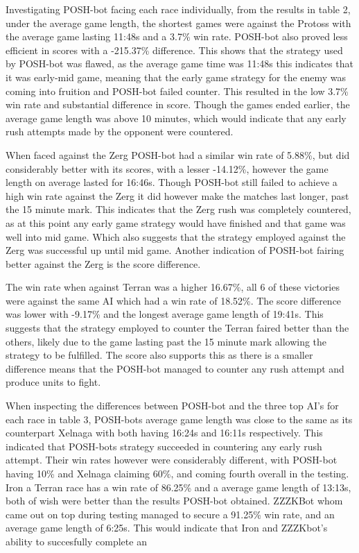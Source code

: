 \documentclass[journal]{IEEEtran}
\begin{document}
Investigating POSH-bot facing each race individually, from the results in table 2, under the average game length, the shortest games were against the Protoss with the average game lasting 11:48s and a 3.7\% win rate. POSH-bot also proved less efficient in scores with a -215.37\% difference. This shows that the strategy used by POSH-bot was flawed, as the average game time was 11:48s this indicates that it was early-mid game, meaning that the early game strategy for the enemy was coming into fruition and POSH-bot failed counter. This resulted in the low 3.7\% win rate and substantial difference in score. Though the games ended earlier, the average game length was above 10 minutes, which would indicate that any early rush attempts made by the opponent were countered.

When faced against the Zerg POSH-bot had a similar win rate of 5.88\%, but did considerably better with its scores, with a lesser -14.12\%, however the game length on average lasted for 16:46s. Though POSH-bot still failed to achieve a high win rate against the Zerg it did however make the matches last longer, past the 15 minute mark. This indicates that the Zerg rush was completely countered, as at this point any early game strategy would have finished and that game was well into mid game. Which also suggests that the strategy employed against the Zerg was successful up until mid game. Another indication of POSH-bot fairing better against the Zerg is the score difference.

The win rate when against Terran was a higher 16.67\%, all 6 of these victories were against the same AI which had a win rate of 18.52\%. The score difference was lower with -9.17\% and the longest average game length of 19:41s. This suggests that the strategy employed to counter the Terran faired better than the others, likely due to the game lasting past the 15 minute mark allowing the strategy to be fulfilled. The score also supports this as there is a smaller difference means that the POSH-bot managed to counter any rush attempt and produce units to fight.

When inspecting the differences between POSH-bot and the three top AI's for each race in table 3, POSH-bots average game length was close to the same as its counterpart Xelnaga with both having 16:24s and 16:11s respectively. This indicated that POSH-bots strategy succeeded in countering any early rush attempt. Their win rates however were considerably different, with POSH-bot having 10\% and Xelnaga claiming 60\%, and coming fourth overall in the testing. Iron a Terran race has a win rate of 86.25\% and a average game length of 13:13s, both of wish were better than the results POSH-bot obtained. ZZZKBot whom came out on top during testing managed to secure a 91.25\% win rate, and an average game length of 6:25s. This would indicate that Iron and ZZZKbot's ability to succesfully complete an 
\end{document}
